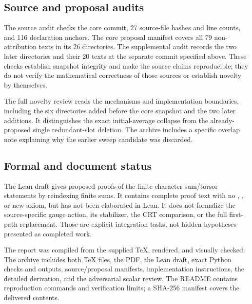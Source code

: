 \subsection{Source and proposal audits}

The source audit checks the core commit, 27 source-file hashes and line counts, and 116 declaration anchors. The core proposal manifest covers all 79 non-attribution texts in its 26 directories. The supplemental audit records the two later directories and their 20 texts at the separate commit specified above. These checks establish snapshot integrity and make the source claims reproducible; they do not verify the mathematical correctness of those sources or establish novelty by themselves.

The full novelty review reads the mechanisms and implementation boundaries, including the six directories added before the core snapshot and the two later additions. It distinguishes the exact initial-average collapse from the already-proposed single redundant-slot deletion. The archive includes a specific overlap note explaining why the earlier sweep candidate was discarded.

\subsection{Formal and document status}

The Lean draft gives proposed proofs of the finite character-sum/torsor statements by reindexing finite sums. It contains complete proof text with no , , or new axiom, but has not been elaborated in Lean. It does not formalize the source-specific gauge action, its stabilizer, the CRT comparison, or the full first-path replacement. Those are explicit integration tasks, not hidden hypotheses presented as completed work.

The report was compiled from the supplied TeX, rendered, and visually checked. The archive includes both TeX files, the PDF, the Lean draft, exact Python checks and outputs, source/proposal manifests, implementation instructions, the detailed derivation, and the adversarial scalar review. The README contains reproduction commands and verification limits; a SHA-256 manifest covers the delivered contents.

\appendix

